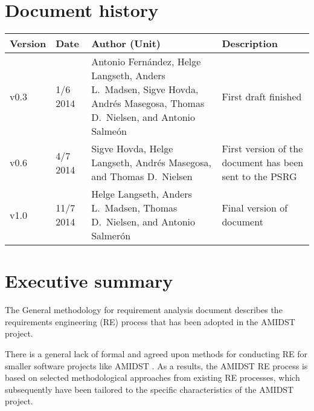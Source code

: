 \documentclass[11pt, oneside]{article}   	%
\begin{document}


%
%



\tableofcontents

\newpage


\section*{Document history}

\begin{table}[htbp]
  \centering
  \begin{tabularx}{\linewidth}{|p{17mm}|p{17mm}|X|X|}\hline
    {\bf Version} & {\bf Date} & {\bf Author (Unit)} & {\bf Description} \\ \hline \hline
    v0.3 & 1/6 2014 & Antonio Fern\'andez, Helge Langseth, Anders L.\ Madsen,  Sigve Hovda, Andr\'es Masegosa, Thomas D.\ Nielsen, and Antonio Salme\'on & First draft finished  \\ \hline
    v0.6 & 4/7 2014 & Sigve Hovda, Helge Langseth, Andr\'es Masegosa, and Thomas D.\ Nielsen& First version of the
    document has been sent to the PSRG  \\ \hline
    v1.0 & 11/7 2014 & Helge Langseth, Anders L.\ Madsen, Thomas D.\ Nielsen, and Antonio Salmer\'on & Final version of document  \\ \hline \hline
  \end{tabularx}
\end{table}

\newpage



\section{Executive summary}

The General methodology for requirement analysis document describes the requirements engineering (RE) process that has
been adopted in the AMIDST project. 

There is a general lack of formal and agreed upon methods for conducting
RE for smaller software projects like AMIDST \cite{Ara07,Qui10}. As a results, the AMIDST RE process is based on selected methodological approaches from existing
RE processes, which subsequently have  been 
tailored to the specific characteristics of the AMIDST project. 
\end{document}
